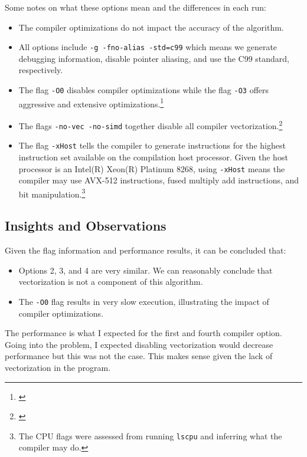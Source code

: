 \documentclass{article}
\newcommand{\MYhref}[3][blue]{\href{#2}{\color{#1}{#3}}}%
\begin{document}
Some notes on what these options mean and the differences in each run:
\begin{itemize}
    \item The compiler optimizations do not impact the accuracy of the algorithm.
    \item All options include \texttt{-g -fno-alias -std=c99} which means we generate 
    debugging information, disable pointer aliasing, and use the C99 standard, respectively.
    \item The flag \texttt{-O0} disables compiler optimizations while the flag \texttt{-O3} offers aggressive and extensive optimizations.\footnote{\MYhref{https://www.intel.com/content/www/us/en/docs/cpp-compiler/developer-guide-reference/2021-8/o-001.html}{Optimizations Compiler Documentation.}}
    \item The flags \texttt{-no-vec -no-simd} together disable all compiler vectorization.\footnote{\MYhref{https://www.intel.com/content/www/us/en/docs/cpp-compiler/developer-guide-reference/2021-8/simd-qsimd.html}{SIMD Compiler Documentation.}}
    \item The flag \texttt{-xHost} tells the compiler to generate instructions for the highest instruction set available on the compilation host processor. Given the host processor is an Intel(R) Xeon(R) Platinum 8268, using \texttt{-xHost} 
    means the compiler may use AVX-512 instructions, fused multiply add instructions, and bit manipulation.\footnote{\MYhref{https://www.intel.com/content/www/us/en/docs/cpp-compiler/developer-guide-reference/2021-8/xhost-qxhost.html}{xHost Compiler Documentation.} The CPU flags were assessed from running \texttt{lscpu} and inferring what the compiler may do.}
\end{itemize}
\subsection*{Insights and Observations}
Given the flag information and performance results, it can be concluded that:
\begin{itemize}
    \item Options 2, 3, and 4 are very similar. We can reasonably conclude that vectorization is not a component of this algorithm. 
    \item The \texttt{-O0} flag results in very slow execution, illustrating the impact of compiler optimizations.
\end{itemize}
The performance is what I expected for the first and fourth compiler option. Going into the problem, I expected disabling vectorization 
would decrease performance but this was not the case. This makes sense given the lack of vectorization in the program.
\end{document}

